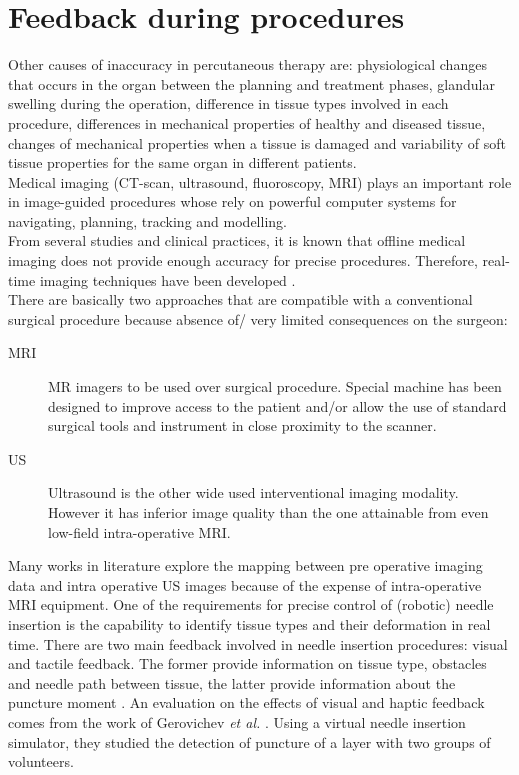 \section{Feedback during procedures}\label{Feedback_during_procedures}
Other causes of inaccuracy in percutaneous therapy are: physiological changes that occurs in the organ between the planning and treatment phases, glandular swelling during the operation, difference in tissue types involved in each procedure, differences in mechanical properties of healthy and diseased tissue, changes of mechanical properties when a tissue is damaged and variability of soft tissue properties for the same organ in different patients.\\
Medical imaging (CT-scan, ultrasound, fluoroscopy, MRI)
plays an important role in image-guided procedures whose rely on powerful computer systems for navigating, planning, tracking and modelling.\\
From several studies and clinical practices, it is known that offline medical imaging does not provide enough accuracy for precise procedures. Therefore, real-time imaging techniques have been developed \cite{Peters2001}.\\
There are basically two approaches that are compatible with a conventional surgical procedure because absence of/ very limited consequences on the surgeon:
\begin{description}
	\item[MRI] MR imagers to be used over surgical procedure. Special machine has been designed to improve access to the patient and/or  allow the use of standard surgical tools and instrument in close proximity to the scanner.
	\item[US] Ultrasound is the other wide used interventional imaging modality. However it has inferior image quality than the one attainable from even low-field intra-operative MRI. 
\end{description}
Many works in literature explore the mapping between pre operative imaging data and intra operative US images because of the expense of intra-operative MRI equipment.
One of the requirements for precise control of (robotic) needle insertion is the capability to identify tissue types and their deformation in real time.
There are two main feedback involved in needle insertion procedures: visual  and tactile feedback. The former provide information on tissue type, obstacles and needle path between tissue, the latter provide information about the puncture moment \cite{Abolhassani2007}.
An evaluation on the effects of visual and haptic feedback comes from the work of Gerovichev \textit{et al.} \cite{Gerovichev2002}. Using a virtual needle insertion simulator, they studied the detection of puncture of a layer with two groups of volunteers.
